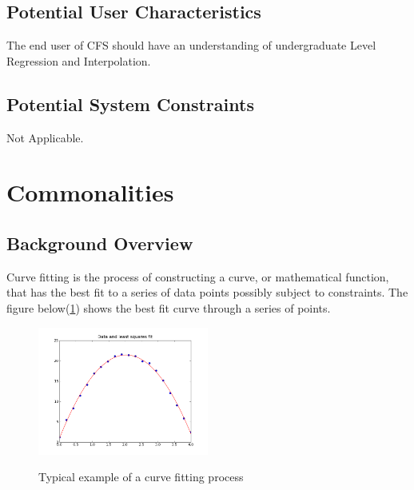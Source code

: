 \documentclass[12pt]{article}
\newcommand{\famname}{CFS} %
\begin{document}
\subsection{Potential User Characteristics} \label{SecUserCharacteristics}

The end user of \famname{} should have an understanding of undergraduate Level
Regression and Interpolation. 

\subsection{Potential System Constraints}

Not Applicable.

\section{Commonalities}


\subsection{Background Overview} \label{Sec_Background}
Curve fitting is the process of constructing a curve, or mathematical function,
that has the best fit to a series of data points possibly subject to
constraints. The figure below(\ref{Fig_CurveFitEg}) shows the best fit curve
through a series of points. 

\begin{figure}[h!]
	\begin{center}
		{
			\includegraphics[width=0.5\textwidth]{lstsq11.png}
		}
		\caption{\label{Fig_CurveFitEg} Typical example of a curve fitting process}
	\end{center}
\end{figure}
\end{document}
